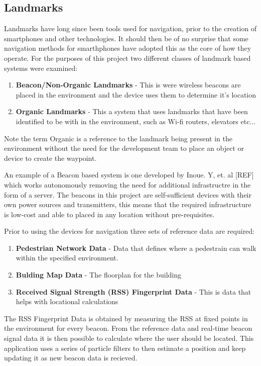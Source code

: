\documentclass[main.tex]{subfiles}
\begin{document}
\subsection{Landmarks}

Landmarks have long since been tools used for navigation, prior to the creation of smartphones and other technologies. It should then be of no surprise that some navigation methods for smarthphones have adopted this as the core of how they operate. For the purposes of this project two different classes of landmark based systems were examined:

\begin{enumerate}
	\item \textbf{Beacon/Non-Organic Landmarks} - This is were wireless beacons are placed in the environment and the device uses them to determine it's location
	\item \textbf{Organic Landmarks} - This a system that uses landmarks that have been identified to be with in the environment, such as Wi-fi routers, elevators etc...
\end{enumerate}

Note the term Organic is a reference to the landmark being present in the environment without the need for the development team to place an object or device to create the waypoint.

An example of a Beacon based system is one developed by Inoue. Y, et. al [REF] which works autonomously removing the need for additional infrastructre in the form of a server. The beacons in this project are self-sufficient devices with their own power sources and transmitters, this means that the required infrastructure is low-cost and able to placed in any location without pre-requisites.

Prior to using the devices for navigation three sets of reference data are required:

\begin{enumerate}
	\item \textbf{Pedestrian Network Data} - Data that defines where a pedestrain can walk within the specified environment.
	\item \textbf{Bulding Map Data} - The floorplan for the building
	\item \textbf{Received Signal Strength (RSS) Fingerprint Data} - This is data that helps with locational calculations
\end{enumerate}

The RSS Fingerprint Data is obtained by measuring the RSS at fixed points in the environment for every beacon. From the reference data and real-time beacon signal data it is then possible to calculate where the user should be located. This application uses a series of particle filters to then estimate a position and keep updating it as new beacon data is recieved.
\end{document}
